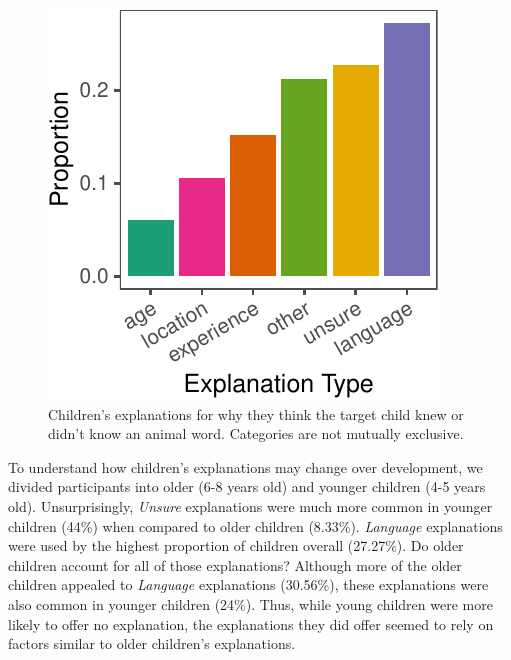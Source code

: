 \documentclass[10pt, letterpaper]{article}
\newenvironment{CodeChunk}{}{}
\begin{document}
\begin{CodeChunk}
\begin{figure}[tb]

{\centering \includegraphics{figs/explanations-1}

}

\caption[Children's explanations for why they think the target child knew or didn't know an animal word]{Children's explanations for why they think the target child knew or didn't know an animal word. Categories are not mutually exclusive.}\label{fig:explanations}
\end{figure}
\end{CodeChunk}

To understand how children's explanations may change over development,
we divided participants into older (6-8 years old) and younger children
(4-5 years old). Unsurprisingly, \emph{Unsure} explanations were much
more common in younger children (44\%) when compared to older children
(8.33\%). \emph{Language} explanations were used by the highest
proportion of children overall (27.27\%). Do older children account for
all of those explanations? Although more of the older children appealed
to \emph{Language} explanations (30.56\%), these explanations were also
common in younger children (24\%). Thus, while young children were more
likely to offer no explanation, the explanations they did offer seemed
to rely on factors similar to older children's explanations.
\end{document}
